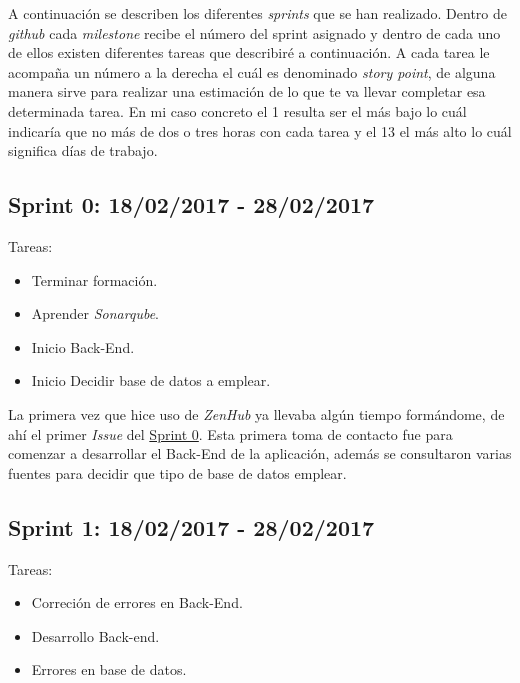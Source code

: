 A continuación se describen los diferentes \emph{sprints} que se han
realizado. Dentro de \emph{github} cada \emph{milestone} recibe el número del sprint asignado y dentro de cada uno de ellos existen diferentes tareas que describiré a continuación. A cada tarea le acompaña un número a la derecha el cuál es denominado \emph{story point}, de alguna manera sirve para realizar una estimación de lo que te va llevar completar esa determinada tarea. En mi caso concreto el 1 resulta ser el más bajo lo cuál indicaría que no más de dos o tres horas con cada tarea y el 13 el más alto lo cuál significa días de trabajo.


\subsection{Sprint 0: 18/02/2017 - 28/02/2017}\label{sprint0}

Tareas:

\begin{itemize}
	\item Terminar formación.
	\item Aprender \emph{Sonarqube}.
	\item Inicio Back-End.
    \item Inicio Decidir base de datos a emplear.
\end{itemize}


La primera vez que hice uso de \emph{ZenHub} ya llevaba algún tiempo formándome, de ahí el primer \emph{Issue} del \underline{Sprint 0}. Esta primera toma de contacto fue para comenzar a desarrollar el Back-End de la aplicación, además se consultaron varias fuentes para decidir que tipo de base de datos emplear.

\subsection{Sprint 1: 18/02/2017 - 28/02/2017}\label{sprint1}

Tareas:

\begin{itemize}
	\item Correción de errores en Back-End.
	\item Desarrollo Back-end.
	\item Errores en base de datos.
\end{itemize}


